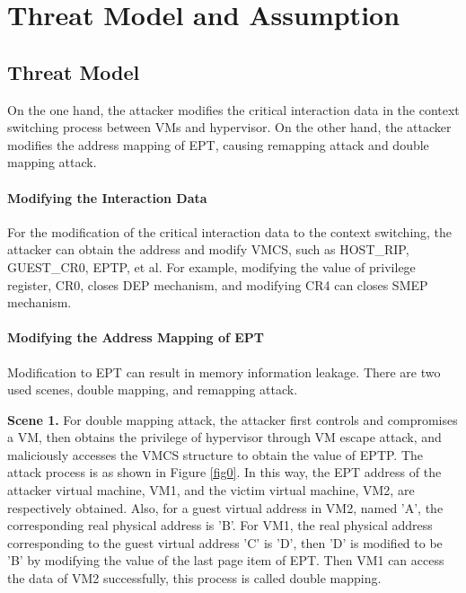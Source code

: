 \documentclass[conference]{IEEEtran}
\begin{document}


\section{Threat Model and Assumption}\label{sec:threat}


\subsection{Threat Model} \label {threat}


On the one hand, the attacker modifies the critical interaction data in the context switching process between VMs and hypervisor. On the other hand, the attacker modifies the address mapping of EPT, causing remapping attack and double mapping attack.


\paragraph{Modifying the Interaction Data}
For the modification of the critical interaction data to the context switching, the attacker can obtain the address 
and modify VMCS, such as HOST\_RIP, GUEST\_CR0, EPTP, et al. For example,
modifying the value of privilege register, CR0, closes DEP mechanism, and modifying CR4 can closes SMEP mechanism.

\paragraph{Modifying the Address Mapping of EPT}
Modification to EPT can result in memory information leakage. There are two used scenes, double mapping, and remapping attack.

\textbf{Scene 1.} 
    For double mapping attack, the attacker first controls and compromises a VM, then obtains the privilege of hypervisor through VM escape attack, and maliciously accesses the VMCS structure to obtain the value of EPTP. The attack process is as shown in Figure \ref{fig0}. In this way, the EPT address of the attacker virtual machine, VM1, and the victim virtual machine, VM2, are respectively obtained. Also, for a guest virtual address in VM2, named 'A', the corresponding real physical address is 'B'. For VM1, the real physical address corresponding to the guest virtual address 'C' is 'D', then 'D' is modified to be 'B' by modifying the value of the last page item of EPT. Then VM1 can access the data of VM2 successfully, this process is called double mapping.
\end{document}
